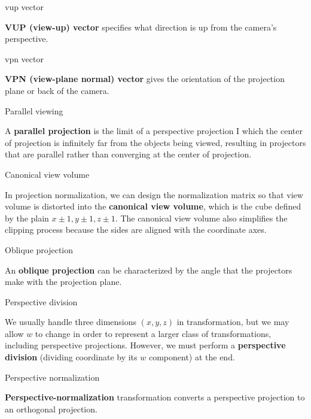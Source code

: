 \documentclass[10pt,a4paper]{article}
\begin{document}
\begin{enumerate}
		{\large \item vup vector}
				
			\textbf{VUP (view-up) vector} specifies what direction is up from the camera’s perspective. \\
				
		{\large \item vpn vector}
				
			\textbf{VPN (view-plane normal) vector} gives the orientation of the projection plane or back of the camera. \\
			
		{\large \item Parallel viewing }
				
			A \textbf{parallel projection} is the limit of a perspective projection I which the center of projection is infinitely far from the objects being viewed, resulting in projectors that are parallel rather than converging at the center of projection.\\
			
		{\large \item Canonical view volume}
				
			In projection normalization, we can design the normalization matrix so that view volume is distorted into the \textbf{canonical view volume}, which is the cube defined by the plain $ x \pm 1, y \pm 1, z \pm 1 $. The canonical view volume also simplifies the clipping process because the sides are aligned with the coordinate axes.\\
			
		{\large \item Oblique projection}
				
			 An \textbf{oblique projection} can be characterized by the angle that the projectors make with the projection plane. \\
			 
		{\large \item Perspective division}
				
			 We usually handle three dimensions $ (x, y, z) $ in transformation, but we may allow $ w $ to change in order to represent a larger class of transformations, including perspective projections. However, we must perform a \textbf{perspective division} (dividing coordinate by its $ w $ component) at the end.\\
			 
		{\large \item Perspective normalization}
				
			 \textbf{Perspective-normalization} transformation converts a perspective projection to an orthogonal projection.\\
			 

\end{enumerate}
\end{document}
